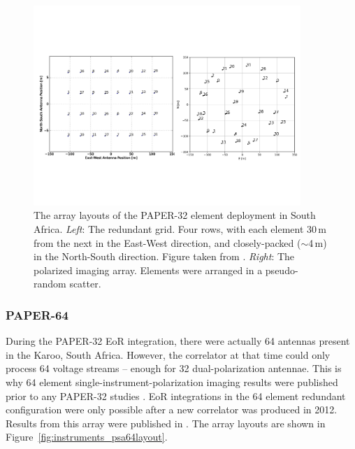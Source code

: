 \begin{figure}
\centering
\includegraphics[width=0.9\textwidth]{chapters/instruments/figures/psa32_layouts.pdf}
\caption[The array layouts of the PAPER-32 element deployment in South Africa.]{The array layouts of the PAPER-32 element deployment in South Africa. \textit{Left}: The redundant grid. Four rows, with each element 30\,m from the next in the East-West direction, and closely-packed ($\sim$4\,m) in the North-South direction. Figure taken from \cite{Parsons.14}. \textit{Right}: The polarized imaging array. Elements were arranged in a pseudo-random scatter.}
\label{fig:instruments_psa32layout}
\end{figure}

\subsubsection{PAPER-64}

During the PAPER-32 EoR integration, there were actually 64 antennas present in the Karoo, South Africa. However, the correlator at that time could only process 64 voltage streams -- enough for 32 dual-polarization antennae. This is why 64 element single-instrument-polarization imaging results were published prior to any PAPER-32 studies \citep{Jacobs.13, Stefan.13}. EoR integrations in the 64 element redundant configuration were only possible after a new correlator was produced in 2012. Results from this array were published in \cite[][Cheng et al. (\textit{submitted}); Kolopanis et al. (\textit{submitted})]{Ali.15, Pober.15}. The array layouts are shown in Figure~\ref{fig:instruments_psa64layout}.

